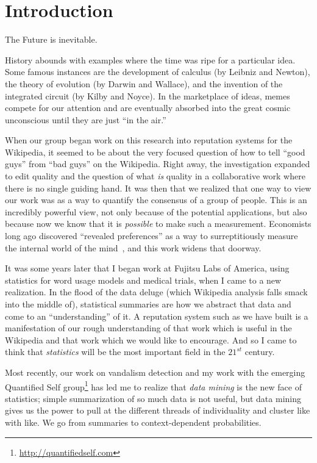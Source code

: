 \section{Introduction}

The Future is inevitable.

History abounds with examples where the time was ripe for a particular idea.
Some famous instances are the development of calculus (by Leibniz and Newton),
the theory of evolution (by Darwin and Wallace), and the invention of
the integrated circuit (by Kilby and Noyce).
In the marketplace of ideas, memes compete for our attention and
are eventually absorbed into the great cosmic unconscious until
they are just ``in the air.''

When our group began work on this research into reputation systems for
the Wikipedia, it seemed to be about the very focused
question of how to tell ``good guys'' from ``bad guys'' on the Wikipedia.
Right away, the investigation expanded to edit quality and the question of what
\textit{is} quality in a collaborative work where there is no single
guiding hand.
It was then that we realized that one way to view our work was as a
way to quantify the consensus of a group of people.
This is an incredibly powerful view, not only because of the potential
applications, but also because now we know that it is \textit{possible}
to make such a measurement.
Economists long ago discovered ``revealed preferences''
as a way to surreptitiously measure the internal world of the
mind~\cite{Samuelson1938,Varian2006}, and this work widens that doorway.

It was some years later that I began work at Fujitsu Labs of America,
using statistics for word usage models and medical trials,
when I came to a new realization.
In the flood of the data deluge (which Wikipedia analysis falls smack
into the middle of), statistical summaries are how we abstract that data
and come to an ``understanding'' of it.
A reputation system such as we have built is a manifestation of our
rough understanding of that work which is useful in the Wikipedia and
that work which we would like to encourage.
And so I came to think that \textit{statistics} will be the
most important field in the $21^{st}$ century.

Most recently, our work on vandalism detection and my work with the
emerging Quantified Self group\footnote{\url{http://quantifiedself.com}}
has led me to realize that
\textit{data mining} is the new face of statistics; simple summarization
of so much data is not useful, but data mining gives us the power to
pull at the different threads of individuality and cluster like with like.
We go from summaries to context-dependent probabilities.

